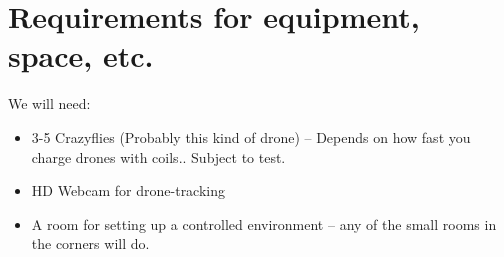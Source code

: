 \documentclass[11pt]{article} %
\begin{document}
\section{Requirements for equipment, space, etc.}
We will need:
\begin{itemize}
\item 3-5 Crazyflies (Probably this kind of drone) -- Depends on how fast you charge drones with coils.. Subject to test.
\item HD Webcam for drone-tracking
\item A room for setting up a controlled environment -- any of the small rooms in the corners will do.
\end{itemize}
\end{document}
